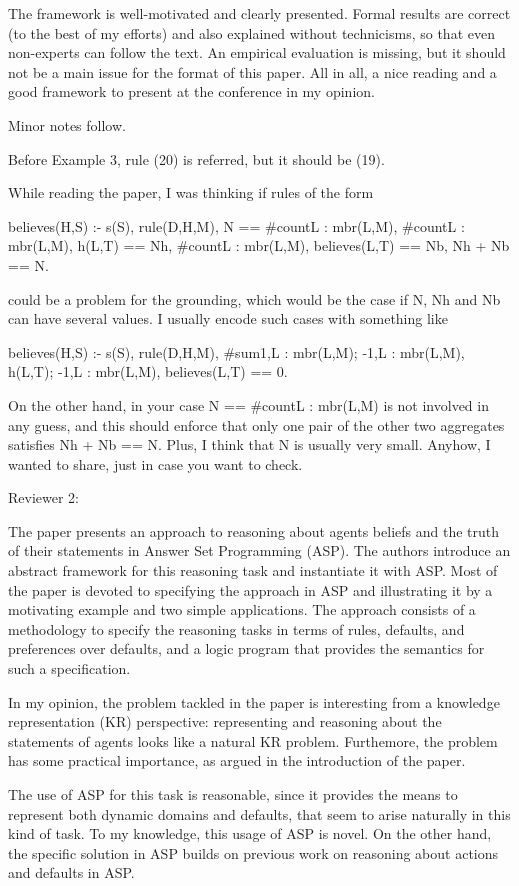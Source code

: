 The framework is well-motivated and clearly presented. Formal results are correct (to the best of my efforts) and also explained without technicisms, so that even non-experts can follow the text. An empirical evaluation is missing, but it should not be a main issue for the format of this paper. All in all, a nice reading and a good framework to present at the conference in my opinion.

Minor notes follow.

Before Example 3, rule (20) is referred, but it should be (19).

While reading the paper, I was thinking if rules of the form

believes(H,S) :- s(S), rule(D,H,M),
N == #count{L : mbr(L,M)},
#count{L : mbr(L,M), h(L,T)} == Nh,
#count{L : mbr(L,M), believes(L,T)} == Nb,
Nh + Nb == N.

could be a problem for the grounding, which would be the case if N, Nh and Nb can have several values. I usually encode such cases with something like

believes(H,S) :- s(S), rule(D,H,M),
#sum{1,L : mbr(L,M);
-1,L : mbr(L,M), h(L,T);
-1,L : mbr(L,M), believes(L,T)} == 0. 

On the other hand, in your case N == #count{L : mbr(L,M)} is not involved in any guess, and this should enforce that only one pair of the other two aggregates satisfies Nh + Nb == N. Plus, I think that N is usually very small. Anyhow, I wanted to share, just in case you want to check.

Reviewer 2: 

The paper presents an approach to reasoning about 
agents beliefs and the truth of their statements in Answer Set Programming (ASP).
The authors introduce an abstract framework for this reasoning task and instantiate it with ASP.
Most of the paper is devoted to specifying the approach in ASP and 
illustrating it by a motivating example and two simple applications.
The approach consists of a methodology to specify the reasoning tasks
in terms of rules, defaults, and preferences over defaults, and 
a logic program that provides the semantics for such a specification.


In my opinion, the problem tackled in the paper is interesting 
from a knowledge representation (KR) perspective: 
representing and reasoning about the statements of agents looks like a natural KR problem. 
Furthemore, the problem has some practical importance, as argued in the introduction of the paper. 

The use of ASP for this task is reasonable, 
since it provides the means to represent both dynamic domains and defaults, 
that seem to arise naturally in this kind of task.
To my knowledge, this usage of ASP is novel.
On the other hand, the specific solution in ASP builds on previous 
work on reasoning about actions and defaults in ASP.

